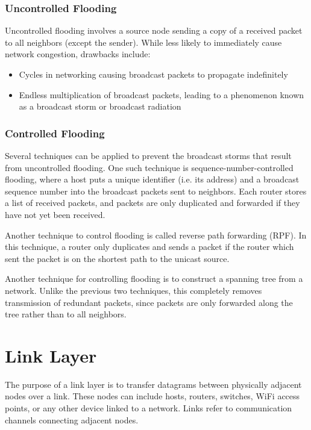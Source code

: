 \documentclass[12pt,titlepage]{article}
\begin{document}
      \subsubsection{Uncontrolled Flooding}
        Uncontrolled flooding involves a source node sending a copy of a received packet to all neighbors (except the sender). While less likely to
        immediately cause network congestion, drawbacks include:
        \begin{itemize}
          \item Cycles in networking causing broadcast packets to propagate indefinitely
          \item Endless multiplication of broadcast packets, leading to a phenomenon known as a broadcast storm or broadcast radiation
        \end{itemize}

      \subsubsection{Controlled Flooding}
        Several techniques can be applied to prevent the broadcast storms that result from uncontrolled flooding. One such technique is
        sequence-number-controlled flooding, where a host puts a unique identifier (i.e. its address) and a broadcast sequence number
        into the broadcast packets sent to neighbors. Each router stores a list of received packets, and packets are only duplicated and
        forwarded if they have not yet been received.

        Another technique to control flooding is called reverse path forwarding (RPF). In this technique, a router only duplicates and sends
        a packet if the router which sent the packet is on the shortest path to the unicast source.

        Another technique for controlling flooding is to construct a spanning tree from a network. Unlike the previous two techniques, this
        completely removes transmission of redundant packets, since packets are only forwarded along the tree rather than to all neighbors.

  \section{Link Layer}
    The purpose of a link layer is to transfer datagrams between physically adjacent nodes over a link. These nodes can include hosts, routers, switches,
    WiFi access points, or any other device linked to a network. Links refer to communication channels connecting adjacent nodes.
\end{document}
